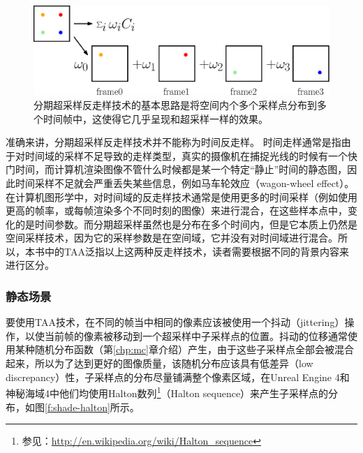 \begin{figure}
	\includegraphics[width=\textwidth]{figures/shade/taa}
	\caption{分期超采样反走样技术的基本思路是将空间内个多个采样点分布到多个时间帧中，这使得它几乎呈现和超采样一样的效果。}
	\label{f:shade-spatial-to-temporal}
\end{figure}

\begin{shaded}
准确来讲，分期超采样反走样技术并不能称为时间反走样。	时间走样通常是指由于对时间域的采样不足导致的走样类型，真实的摄像机在捕捉光线的时候有一个快门时间，而计算机渲染图像不管什么时候都是某一个特定“静止”时间的静态图，因此时间采样不足就会严重丢失某些信息，例如马车轮效应（wagon-wheel effect）。在计算机图形学中，对时间域的反走样技术通常是使用更多的时间采样（例如使用更高的帧率，或每帧渲染多个不同时刻的图像）来进行混合，在这些样本点中，变化的是时间参数。而分期超采样虽然也是分布在多个时间内，但是它本质上仍然是空间采样技术，因为它的采样参数是在空间域，它并没有对时间域进行混合。所以，本书中的TAA泛指以上这两种反走样技术，读者需要根据不同的背景内容来进行区分。
\end{shaded}






\subsubsection{静态场景}
要使用TAA技术，在不同的帧当中相同的像素应该被使用一个抖动（jittering）操作，以使当前帧的像素被移动到一个超采样中子采样点的位置。抖动的位移通常使用某种随机分布函数（第\ref{chp:mc}章介绍）产生，由于这些子采样点全部会被混合起来，所以为了达到更好的图像质量，该随机分布应该具有低差异（low discrepancy）性，子采样点的分布尽量铺满整个像素区域，在Unreal Engine 4和神秘海域4中他们均使用Halton数列\footnote{参见：\url{http://en.wikipedia.org/wiki/Halton_sequence}}（Halton sequence）来产生子采样点的分布，如图\ref{f:shade-halton}所示。

